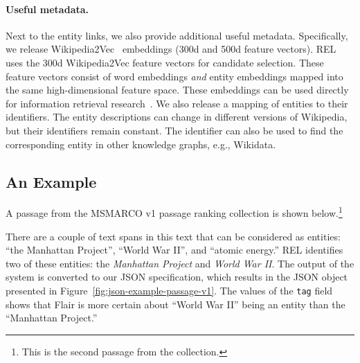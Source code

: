 \paragraph{Useful metadata.} Next to the entity links, we also provide additional useful metadata. Specifically, we release Wikipedia2Vec~\citep{wikipedia2vec} embeddings (300d and 500d feature vectors). REL uses the 300d Wikipedia2Vec feature vectors for candidate selection. These feature vectors consist of word embeddings \emph{and} entity embeddings mapped into the same high-dimensional feature space. These embeddings can be used directly for information retrieval research~\citep{Gerritse:2020:GEER, Gerritse:2022:EMBERT}. We also release a mapping of entities to their identifiers. The entity descriptions can change in different versions of Wikipedia, but their identifiers remain constant. The identifier can also be used to find the corresponding entity in other knowledge graphs, e.g., Wikidata.

\subsection{An Example}
A passage from the MSMARCO v1 passage ranking collection is shown below.\footnote{This is the second passage from the collection.} %

\begin{center}
\end{center}
%
There are a couple of text spans in this text that can be considered as entities: ``the Manhattan Project'', ``World War II'', and ``atomic energy.'' REL identifies two of these entities: the \emph{Manhattan Project} and \emph{World War II}. 
The output of the system is converted to our JSON specification, which results in the JSON object presented in Figure~\ref{fig:json-example-passage-v1}. The values of the \texttt{tag} field shows that Flair is more certain about ``World War II'' being an entity than the ``Manhattan Project.'' 

